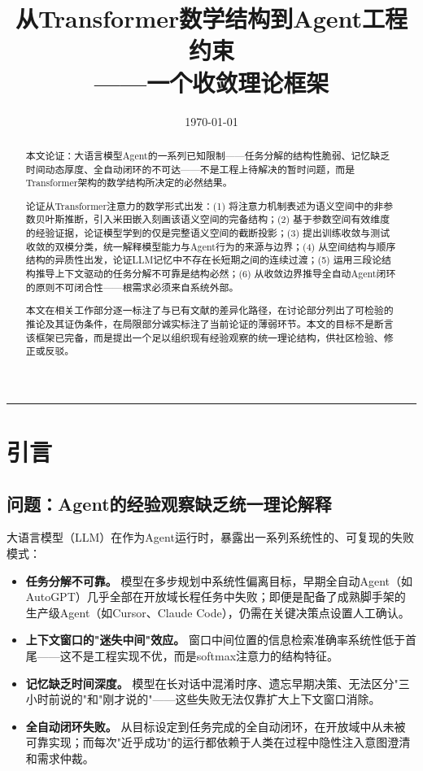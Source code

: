 \documentclass[11pt,a4paper]{ctexart}
\title{\textbf{从Transformer数学结构到Agent工程约束\\[4pt]
        ——一个收敛理论框架}}
\author{}
\date{\today}
\begin{document}
\maketitle

\begin{center}
\rule{0.8\textwidth}{0.5pt}
\end{center}

\begin{abstract}
\noindent
本文论证：大语言模型Agent的一系列已知限制——任务分解的结构性脆弱、记忆缺乏时间动态厚度、全自动闭环的不可达——不是工程上待解决的暂时问题，而是Transformer架构的数学结构所决定的必然结果。

论证从Transformer注意力的数学形式出发：(1) 将注意力机制表述为语义空间中的非参数贝叶斯推断，引入米田嵌入刻画该语义空间的完备结构；(2) 基于参数空间有效维度的经验证据，论证模型学到的仅是完整语义空间的截断投影；(3) 提出训练收敛与测试收敛的双模分类，统一解释模型能力与Agent行为的来源与边界；(4) 从空间结构与顺序结构的异质性出发，论证LLM记忆中不存在长短期之间的连续过渡；(5) 运用三段论结构推导上下文驱动的任务分解不可靠是结构必然；(6) 从收敛边界推导全自动Agent闭环的原则不可闭合性——根需求必须来自系统外部。

本文在相关工作部分逐一标注了与已有文献的差异化路径，在讨论部分列出了可检验的推论及其证伪条件，在局限部分诚实标注了当前论证的薄弱环节。本文的目标不是断言该框架已完备，而是提出一个足以组织现有经验观察的统一理论结构，供社区检验、修正或反驳。
\end{abstract}


\section{引言}

\subsection{问题：Agent的经验观察缺乏统一理论解释}

大语言模型（LLM）在作为Agent运行时，暴露出一系列系统性的、可复现的失败模式：

\begin{itemize}[leftmargin=*]
    \item \textbf{任务分解不可靠。} 模型在多步规划中系统性偏离目标，早期全自动Agent（如AutoGPT）几乎全部在开放域长程任务中失败；即便是配备了成熟脚手架的生产级Agent（如Cursor、Claude Code），仍需在关键决策点设置人工确认。
    \item \textbf{上下文窗口的"迷失中间"效应。} 窗口中间位置的信息检索准确率系统性低于首尾——这不是工程实现不优，而是softmax注意力的结构特征。
    \item \textbf{记忆缺乏时间深度。} 模型在长对话中混淆时序、遗忘早期决策、无法区分"三小时前说的"和"刚才说的"——这些失败无法仅靠扩大上下文窗口消除。
    \item \textbf{全自动闭环失败。} 从目标设定到任务完成的全自动闭环，在开放域中从未被可靠实现；而每次"近乎成功"的运行都依赖于人类在过程中隐性注入意图澄清和需求仲裁。
\end{itemize}
\end{document}
